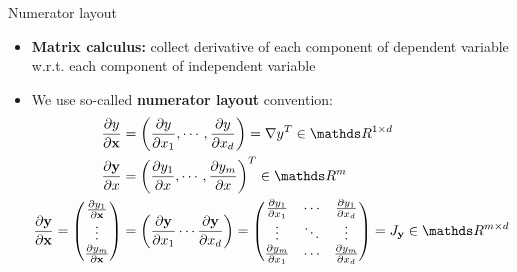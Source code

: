 \documentclass[11pt,compress,t,notes=noshow, xcolor=table]{beamer}
\begin{document}
\begin{vbframe}{Numerator layout}

\begin{itemize}
    \item \textbf{Matrix calculus:} collect derivative of each component of dependent variable w.r.t. each component of independent variable
    \item We use so-called \textbf{numerator layout} convention:
        \begin{align*}
            \frac{\partial y}{\partial\xv} &= \left(\frac{\partial y}{\partial x_1}, \cdots, \frac{\partial y}{\partial x_d}\right) = \nabla y^T \in \R^{1\times d} \\
            \frac{\partial\yv}{\partial x} &= \left(\frac{\partial y_1}{\partial x}, \cdots, \frac{\partial y_m}{\partial x}\right)^T \in \R^{m} \\
            \frac{\partial\yv}{\partial\xv} =
            \begin{pmatrix}
                \frac{\partial y_1}{\partial\xv} \\
                \vdots \\
                \frac{\partial y_m}{\partial\xv} \\
            \end{pmatrix} &=
            \left(\frac{\partial\yv}{\partial x_1} \cdots \frac{\partial\yv}{\partial x_d}\right) =
            \begin{pmatrix}
                \frac{\partial y_1}{\partial x_1} & \cdots & \frac{\partial y_1}{\partial x_d} \\
                \vdots & \ddots & \vdots \\ 
                \frac{\partial y_m}{\partial x_1} & \cdots & \frac{\partial y_m}{\partial x_d}
            \end{pmatrix} = J_\yv \in \R^{m \times d}
        \end{align*}
\end{itemize}

\end{vbframe}
\end{document}
